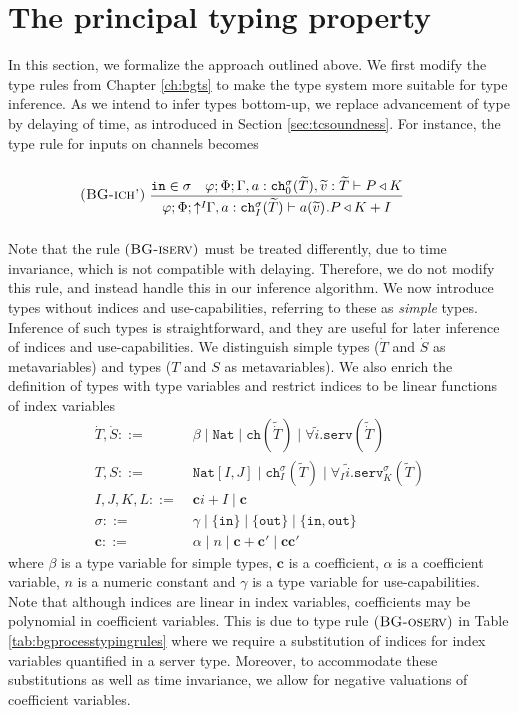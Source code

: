\section{The principal typing property}
In this section, we formalize the approach outlined above. We first modify the type rules from Chapter \ref{ch:bgts} to make the type system more suitable for type inference. As we intend to infer types bottom-up, we replace advancement of type by delaying of time, as introduced in Section \ref{sec:tcsoundness}. For instance, the type rule for inputs on channels becomes
\begin{align*}
    \kern-8em\runa{BG-ich'}\;\infrule{\texttt{in}\in\sigma\quad \varphi;\Phi;\Gamma,a:\texttt{ch}^\sigma_0(\widetilde{T}),\widetilde{v}:\widetilde{T} \vdash P \triangleleft K}{\varphi;\Phi;\uparrow^I\!\!\Gamma,a:\texttt{ch}^\sigma_I(\widetilde{T})\vdash \inputch{a}{\widetilde{v}}{}{P} \triangleleft K + I}
\end{align*}
Note that the rule $\mbox{\textsc{\protect{(BG-iserv})}}$ must be treated differently, due to time invariance, which is not compatible with delaying. Therefore, we do not modify this rule, and instead handle this in our inference algorithm. We now introduce types without indices and use-capabilities, referring to these as \textit{simple} types. Inference of such types is straightforward, and they are useful for later inference of indices and use-capabilities. We distinguish simple types ($\dot{T}$ and $\dot{S}$ as metavariables) and types ($T$ and $S$ as metavariables). We also enrich the definition of types with type variables and restrict indices to be linear functions of index variables 
\begin{align*}
    \dot{T},\dot{S} ::=&\; \beta \mid  \texttt{Nat} \mid \texttt{ch}(\widetilde{\dot{T}}) \mid \forall\widetilde{i}.\texttt{serv}(\widetilde{\dot{T}})\\
    T,S ::=&\; \texttt{Nat}[I,J] \mid \texttt{ch}^\sigma_I(\widetilde{T}) \mid \forall_I\widetilde{i}.\texttt{serv}^\sigma_K(\widetilde{T})\\
    I,J,K,L ::=&\; \mathbf{c} i + I \mid \mathbf{c}\\
    \sigma ::=&\; \gamma \mid \{\texttt{in}\} \mid \{\texttt{out}\} \mid \{\texttt{in},\texttt{out}\}\\
    \mathbf{c} ::=&\; \alpha \mid n \mid \mathbf{c} + \mathbf{c}' \mid \mathbf{c} \mathbf{c}'
\end{align*}
where $\beta$ is a type variable for simple types, $\mathbf{c}$ is a coefficient, $\alpha$ is a coefficient variable, $n$ is a numeric constant and $\gamma$ is a type variable for use-capabilities. Note that although indices are linear in index variables, coefficients may be polynomial in coefficient variables. This is due to type rule $\mbox{\textsc{\protect{(BG-oserv})}}$ in Table \ref{tab:bgprocesstypingrules} where we require a substitution of indices for index variables quantified in a server type. Moreover, to accommodate these substitutions as well as time invariance, we allow for negative valuations of coefficient variables.\\


